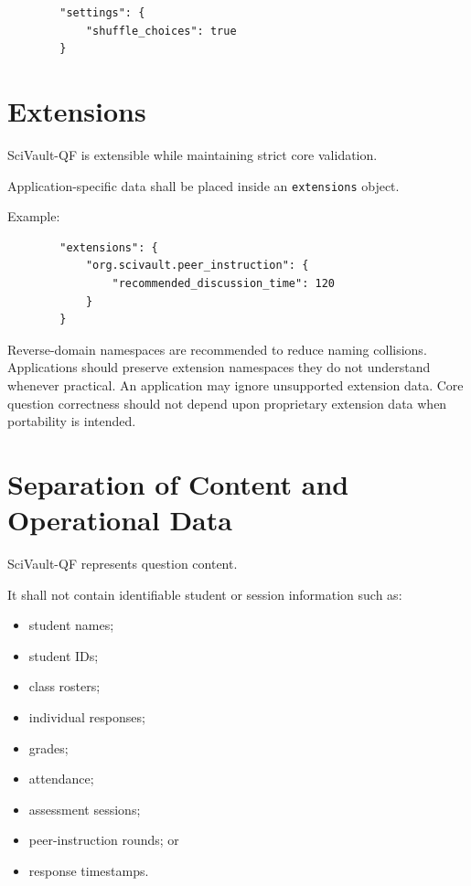 \documentclass[11pt]{article}
\begin{document}
	\begin{lstlisting}
		"settings": {
			"shuffle_choices": true
		}
	\end{lstlisting}
	
	\section{Extensions}
	
	SciVault-QF is extensible while maintaining strict core validation.
	
	Application-specific data shall be placed inside an \texttt{extensions}
	object.
	
	Example:
	
	\begin{lstlisting}
		"extensions": {
			"org.scivault.peer_instruction": {
				"recommended_discussion_time": 120
			}
		}
	\end{lstlisting}
	
	Reverse-domain namespaces are recommended to reduce naming collisions.
	Applications should preserve extension namespaces they do not understand
	whenever practical.
	An application may ignore unsupported extension data.
	Core question correctness should not depend upon proprietary extension data
	when portability is intended.
	
	\section{Separation of Content and Operational Data}
	
	SciVault-QF represents question content.
	
	It shall not contain identifiable student or session information such as:
	
	\begin{itemize}
		\item student names;
		\item student IDs;
		\item class rosters;
		\item individual responses;
		\item grades;
		\item attendance;
		\item assessment sessions;
		\item peer-instruction rounds; or
		\item response timestamps.
	\end{itemize}
	
\end{document}
